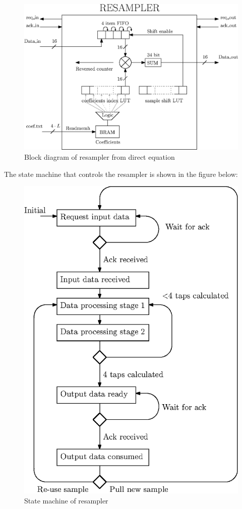 \documentclass[a4paper,twoside,11pt, fleqn]{article}
\begin{document}
\begin{figure}[h]
	\includegraphics[scale = 1]{Images/4_blockdiagram}
    \caption{Block diagram of resampler from direct equation}
\end{figure}

\newpage
The state machine that controls the resampler is shown in the figure below:
\begin{figure}[h]
	\includegraphics[scale = 1]{Images/4_statemachine}
    \caption{State machine of resampler}
\end{figure}
\end{document}
